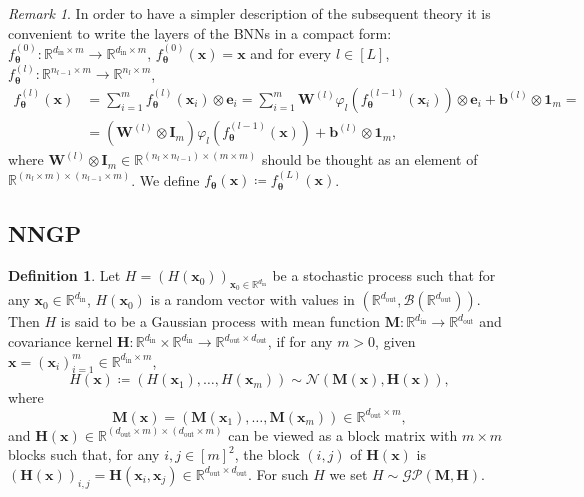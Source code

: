 \documentclass[a4paper, 11pt, reqno]{amsart}
\theoremstyle{plain}
\theoremstyle{remark}
\newtheorem{remark}[theorem]{Remark}
\theoremstyle{definition}
\newtheorem{definition}[theorem]{Definition}
\newcommand{\normal}[2]{\mathcal{N}\left(#1, #2\right)}
\newcommand{\real}{\mathbb{R}}
\newcommand{\borel}[1]{\mathcal{B}\left(#1\right)}
\begin{document}
\begin{remark} \label{rem:nncompact}
    In order to have a simpler description of the subsequent theory it is convenient to write the layers of the BNNs in a compact form: $f^{(0)}_{\bm{\theta}}: \real^{d_{\mathrm{in}} \times m} \to \real^{d_{\mathrm{in}} \times m}$, $f^{(0)}_{\bm{\theta}}(\bm{x}) = \bm{x}$ and for every $l \in [L]$, $f^{(l)}_{\bm{\theta}}: \real^{n_{l - 1} \times m} \to \real^{n_l \times m}$,
    \begin{align*}
        f^{(l)}_{\bm{\theta}}(\bm{x}) & = \sum_{i = 1}^m f^{(l)}_{\bm{\theta}}(\bm{x}_i) \otimes \bm{e}_i = \sum_{i = 1}^m \bm{W}^{(l)} \varphi_l\left(f^{(l - 1)}_{\bm{\theta}}(\bm{x}_i)\right) \otimes \bm{e}_i + \bm{b}^{(l)} \otimes \bm{1}_{m} = \\
        & = \left(\bm{W}^{(l)} \otimes \bm{I}_{m}\right) \varphi_l\left(f^{(l - 1)}_{\bm{\theta}}(\bm{x})\right) + \bm{b}^{(l)} \otimes \bm{1}_{m},
    \end{align*}
    where $\bm{W}^{(l)} \otimes \bm{I}_{m} \in \real^{(n_l \times n_{l - 1}) \times (m \times m)}$ should be thought as an element of $\real^{(n_l \times m) \times (n_{l - 1} \times m)}$. We define $f_{\bm{\theta}}(\bm{x}) \coloneqq f^{(L)}_{\bm{\theta}}(\bm{x})$.
\end{remark}

\subsection{NNGP} 

\begin{definition} \label{def:gp}
    Let $H = (H(\bm{x}_0))_{\bm{x}_0 \in \real^{d_{\mathrm{in}}}}$ be a stochastic process such that for any $\bm{x}_0 \in \real^{d_{\mathrm{in}}}$, $H(\bm{x}_0)$ is a random vector with values in $\left(\real^{d_{\mathrm{out}}}, \borel{\real^{d_{\mathrm{out}}}}\right)$. 
    Then $H$ is said to be a Gaussian process with mean function $\bm{M}: \real^{d_{\mathrm{in}}} \to \real^{d_{\mathrm{out}}}$ and covariance kernel $\bm{H}: \real^{d_{\mathrm{in}}} \times \real^{d_{\mathrm{in}}} \to \real^{d_{\mathrm{out}} \times d_{\mathrm{out}}}$, if for any $m > 0$, given $\bm{x} = (\bm{x}_i)_{i = 1}^m \in \real^{d_{\mathrm{in}} \times m}$,
    \begin{equation*}
        H(\bm{x}) \coloneqq \left(H(\bm{x}_1), \dots, H(\bm{x}_m)\right) \sim \normal{\bm{M}(\bm{x})}{\bm{H}(\bm{x})},
    \end{equation*}
    where
    \begin{equation*}
        \bm{M}(\bm{x}) = \left(\bm{M}(\bm{x}_1), \dots, \bm{M}(\bm{x}_m)\right) \in \real^{d_{\mathrm{out}} \times m},
    \end{equation*}
    and $\bm{H}(\bm{x}) \in \real^{(d_{\mathrm{out}} \times m) \times (d_{\mathrm{out}} \times m)}$ can be viewed as a block matrix with $m \times m$ blocks such that, for any $i, j \in [m]^2$, the block $(i, j)$ of $\bm{H}(\bm{x})$ is $\left(\bm{H}(\bm{x})\right)_{i, j} = \bm{H}(\bm{x}_i, \bm{x}_j) \in \real^{d_{\mathrm{out}} \times d_{\mathrm{out}}}$. 
    For such $H$ we set $H \sim \mathcal{GP}\left(\bm{M}, \bm{H}\right)$. 
\end{definition}
\end{document}

